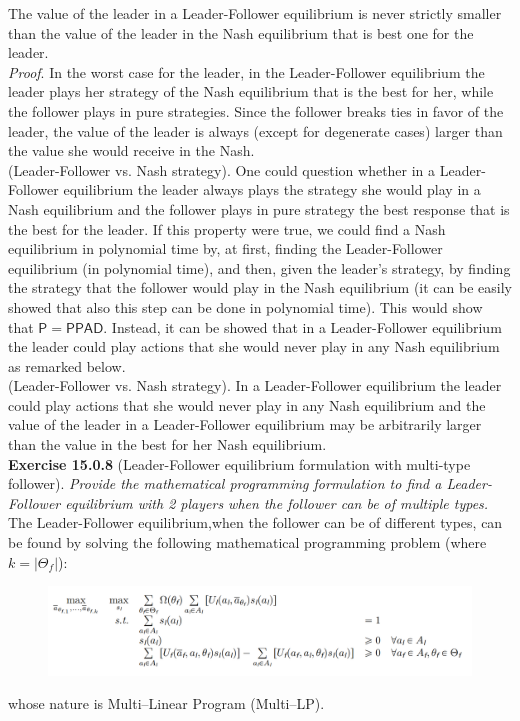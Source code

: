 The value of the leader in a Leader-Follower equilibrium is never strictly smaller than the value of the leader in the Nash equilibrium that is best one for the leader.\\
\textit{Proof}. In the worst case for the leader, in the Leader-Follower equilibrium the leader plays her strategy of the Nash equilibrium that is the best for her, while the follower plays in pure strategies. Since the follower breaks ties in favor of the leader, the value of the leader is always (except for degenerate cases) larger than the value she would receive in the Nash.\\
(Leader-Follower vs. Nash strategy). One could question whether in a Leader-Follower equilibrium the leader always plays the strategy she would play in a Nash equilibrium and the follower plays in pure strategy the best response that is the best for the leader. If this property were true, we could find a Nash equilibrium in polynomial time by, at first, finding the Leader-Follower equilibrium (in polynomial time), and then, given the leader's strategy, by finding the strategy that the follower would play in the Nash equilibrium (it can be easily showed that also this step can be done in polynomial time). This would show that $\mathsf{P=PPAD}$. Instead, it can be showed that in a Leader-Follower equilibrium the leader could play actions that she would never play in any Nash equilibrium as remarked below.\\ (Leader-Follower vs. Nash strategy). In a Leader-Follower equilibrium the leader could play actions that she would never play in any Nash equilibrium and the value of the leader in a Leader-Follower equilibrium may be arbitrarily larger than the value in the best for her Nash equilibrium.\\

\textbf{Exercise 15.0.8} (Leader-Follower equilibrium formulation with multi-type follower). \textit{Provide the mathematical programming formulation to find a Leader-Follower equilibrium with 2 players when the follower can be of multiple types.}\\

The Leader-Follower equilibrium,when the follower can be of different types, can be found by solving the following mathematical programming problem (where $k = |\Theta_f|$):
\begin{figure}[H]
\centering
\includegraphics[width=\textwidth]{images/img_3_15_05.png}
\end{figure}
whose nature is Multi–Linear Program (Multi–LP).\\

